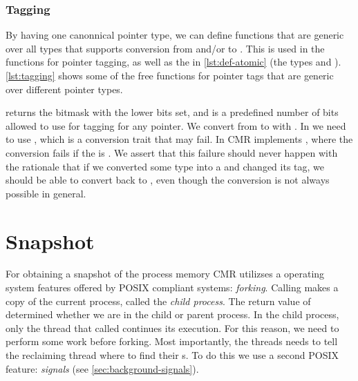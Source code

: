 \subsubsection{Tagging}

By having one canonnical pointer type, we can define functions that are generic over all types
that supports conversion from and/or to . This is used in the functions for
pointer tagging, as well as the  in \cref{lst:def-atomic} (the types  and
). \cref{lst:tagging} shows some of the free functions for pointer tags that are generic
over different pointer types.

\begin{figure}[ht]

\end{figure}

 returns the bitmask with the  lower bits set, and  is a
predefined number of bits allowed to use for tagging for any pointer. We convert from  to
 with  .  In   we need
to use , which is a conversion trait that may fail. In CMR  implements
, where the conversion fails if the  is . We
assert that this failure should never happen  with the rationale that if we converted
some type  into a  and changed its tag, we should be able to convert back
to , even though the conversion is not always possible in general.



\section{Snapshot\label{sec:impl-snapshot}}

For obtaining a snapshot of the process memory CMR utilizses a operating system features offered
by POSIX compliant systems: \emph{forking}.
Calling  makes a copy of the current process, called the \emph{child process}.
The return value of  determined whether we are in the child or parent process.
In the child process, only the thread that called  continues its execution. For this
reason, we need to perform some work before forking. Most importantly, the threads needs to tell
the reclaiming thread where to find their s. To do this we use a second POSIX feature:
\emph{signals} (see \cref{sec:background-signals}).

